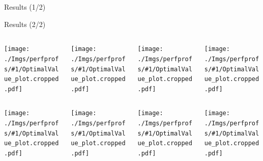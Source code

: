 \newcommand{\IncludeDualBounds}[1]{
	\centering
	\texttt{[image: ./Imgs/perfprofs/\#1/OptimalValue\_plot.cropped.pdf]}
}

\begin{frame}{Results (1/2)}
\end{frame}
\begin{frame}
\end{frame}
\begin{frame}
\end{frame}
\begin{frame}
\end{frame}

\begin{frame}{Results (2/2)}
	\begin{columns}
		\begin{column}{0.25\textwidth}
			\IncludeDualBounds{E-scaled-1.0}
		\end{column}
		\begin{column}{0.25\textwidth}
			\IncludeDualBounds{E-scaled-4.0}
		\end{column}
		\begin{column}{0.25\textwidth}
			\IncludeDualBounds{E-scaled-8.0}
		\end{column}
		\begin{column}{0.25\textwidth}
			\IncludeDualBounds{E-scaled-20.0}
		\end{column}
	\end{columns}
	\begin{columns}
		\begin{column}{0.25\textwidth}
			\IncludeDualBounds{F-scaled-1.0}
		\end{column}
		\begin{column}{0.25\textwidth}
			\IncludeDualBounds{F-scaled-4.0}
		\end{column}
		\begin{column}{0.25\textwidth}
			\IncludeDualBounds{F-scaled-8.0}
		\end{column}
		\begin{column}{0.25\textwidth}
			\IncludeDualBounds{F-scaled-20.0}
		\end{column}
	\end{columns}

\end{frame}

